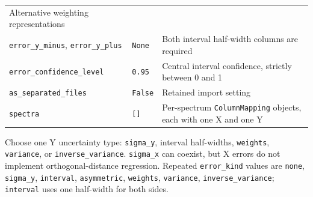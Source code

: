 \documentclass[
  10pt,
  a4paper,
  oneside]{scrreprt}
\begin{document}
\begin{longtable}[]{@{}lll@{}}
\begin{minipage}[t]{0.30\columnwidth}
Alternative weighting representations\strut
\end{minipage}\tabularnewline
\begin{minipage}[t]{0.30\columnwidth}\raggedright
\texttt{error\_y\_minus}, \texttt{error\_y\_plus}\strut
\end{minipage} & \begin{minipage}[t]{0.30\columnwidth}\raggedright
\texttt{None}\strut
\end{minipage} & \begin{minipage}[t]{0.30\columnwidth}\raggedright
Both interval half-width columns are required\strut
\end{minipage}\tabularnewline
\begin{minipage}[t]{0.30\columnwidth}\raggedright
\texttt{error\_confidence\_level}\strut
\end{minipage} & \begin{minipage}[t]{0.30\columnwidth}\raggedright
\texttt{0.95}\strut
\end{minipage} & \begin{minipage}[t]{0.30\columnwidth}\raggedright
Central interval confidence, strictly between 0 and 1\strut
\end{minipage}\tabularnewline
\begin{minipage}[t]{0.30\columnwidth}\raggedright
\texttt{as\_separated\_files}\strut
\end{minipage} & \begin{minipage}[t]{0.30\columnwidth}\raggedright
\texttt{False}\strut
\end{minipage} & \begin{minipage}[t]{0.30\columnwidth}\raggedright
Retained import setting\strut
\end{minipage}\tabularnewline
\begin{minipage}[t]{0.30\columnwidth}\raggedright
\texttt{spectra}\strut
\end{minipage} & \begin{minipage}[t]{0.30\columnwidth}\raggedright
\texttt{{[}{]}}\strut
\end{minipage} & \begin{minipage}[t]{0.30\columnwidth}\raggedright
Per-spectrum \texttt{ColumnMapping} objects, each with one X and one
Y\strut
\end{minipage}\tabularnewline
\bottomrule
\end{longtable}

Choose one Y uncertainty type: \texttt{sigma\_y}, interval half-widths,
\texttt{weights}, \texttt{variance}, or \texttt{inverse\_variance}.
\texttt{sigma\_x} can coexist, but X errors do not implement
orthogonal-distance regression. Repeated \texttt{error\_kind} values are
\texttt{none}, \texttt{sigma\_y}, \texttt{interval},
\texttt{asymmetric}, \texttt{weights}, \texttt{variance},
\texttt{inverse\_variance}; \texttt{interval} uses one half-width for
both sides.
\end{document}

